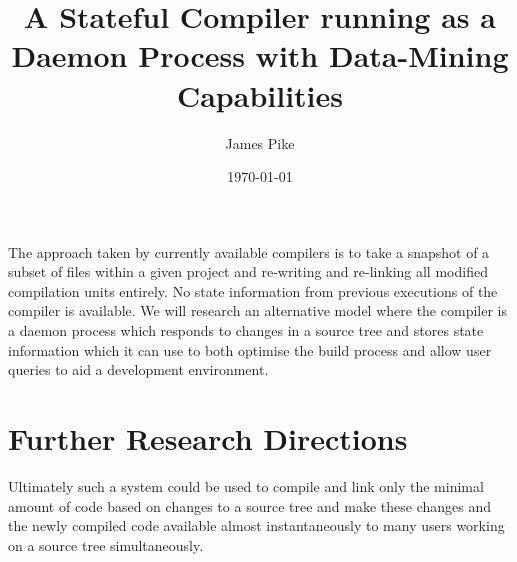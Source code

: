 \documentclass{article}
\begin{document}
\title{A Stateful Compiler running as a Daemon Process with Data-Mining Capabilities}
\author{James Pike}
\date{\today}

\maketitle

The approach taken by currently available compilers is to take a snapshot
of a subset of files within a given project and re-writing and re-linking all
modified compilation units entirely. No state information from previous
executions of the compiler is available. We will research an alternative 
model where the compiler is a daemon process which responds to changes in a
source tree and stores state information which it can use to both optimise the 
build process and allow user queries to aid a development environment. 

\section*{Further Research Directions}

Ultimately such a system could be used to compile and link only the minimal 
amount of code based on changes to a source tree and make these changes and 
the newly compiled code available almost instantaneously to many users 
working on a source tree simultaneously.

% 
% 
\end{document}
